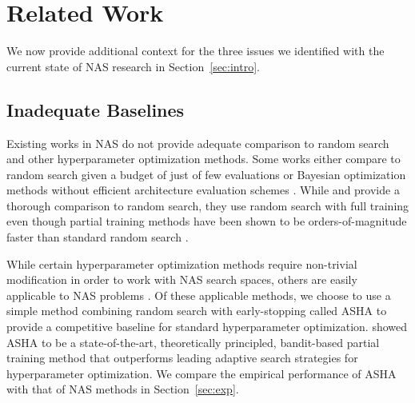 \documentclass[acmlarge, nonacm]{acmart}
\begin{document}
\section{Related Work}
\label{sec:related}
We now provide additional context for the three issues we identified with the current state of NAS research in Section~\ref{sec:intro}.  

\subsection{Inadequate Baselines}
Existing works in NAS do not provide adequate comparison to random search and other hyperparameter optimization methods.  Some works either compare to random search given a budget of just of few evaluations \citep{pham18ENAS,liu2018darts} or Bayesian optimization methods without efficient architecture evaluation schemes \citep{Jin2018}.  While \citet{Real2018} and \citet{cai2018path} provide a thorough comparison to random search, they use random search with full training even though partial training methods have been shown to be orders-of-magnitude faster than standard random search \citep{hyperband, asha}.  

While certain hyperparameter optimization methods \citep{snoek2012practical, maclaurin2015gradient, fabolas2016} require non-trivial modification in order to work with NAS search spaces, others are easily applicable to NAS problems \citep{Hutter2011, Bergstra2011, earlystopping2015,falkner2018bohb,hyperband,asha}.  Of these applicable methods, we choose to use a simple method combining random search with early-stopping called ASHA \citep{asha} to provide a competitive baseline for standard hyperparameter optimization. \citet{asha} showed ASHA to be a state-of-the-art, theoretically principled, bandit-based partial training method that outperforms leading adaptive search strategies for hyperparameter optimization.  We compare the empirical performance of ASHA with that of NAS methods in Section~\ref{sec:exp}.
\end{document}
